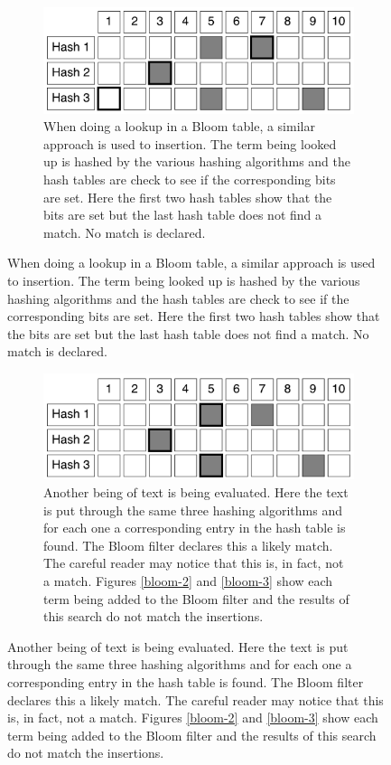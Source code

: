 \documentclass{article}
\begin{document}
\begin{figure}[hbt]
  \ContinuedFloat  
  \label{bloom-4}
  \centering
  \begin{subfigure}{\textwidth}
  \makeatletter
  \includegraphics[width=\textwidth]{images/bloom-4}
  \caption{When doing a lookup in a Bloom table, a similar approach is used to insertion. The term being looked up is hashed by the various hashing algorithms and the hash tables are check to see if the corresponding bits are set. Here the first two hash tables show that the bits are set but the last hash table does not find a match. No match is declared.}
  \end{subfigure}
\end{figure}

\begin{figure}[hbt]
  \ContinuedFloat  
  \label{bloom-5}
  \centering
  \begin{subfigure}{\textwidth}
  \makeatletter
  \includegraphics[width=\textwidth]{images/bloom-5}
  \caption{Another being of text is being evaluated. Here the text is put through the same three hashing algorithms and for each one a corresponding entry in the hash table is found. The Bloom filter declares this a likely match. The careful reader may notice that this is, in fact, not a match. Figures \ref{bloom-2} and \ref{bloom-3} show each term being added to the Bloom filter and the results of this search do not match the insertions.}
  \end{subfigure}
\end{figure}
\end{document}
